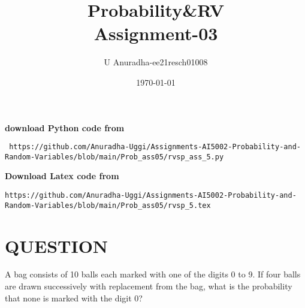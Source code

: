 \documentclass[journal,12pt,twocolumn]{IEEEtran}
\title{Probability\&RV \\ Assignment-03}
\author{U Anuradha-ee21resch01008}
\date{\today}
\begin{document}
\maketitle
\newpage
\bigskip
\renewcommand{\thefigure}{\theenumi}
\renewcommand{\thetable}{\theenumi}
\textbf{download Python code from}
\begin{lstlisting}
 https://github.com/Anuradha-Uggi/Assignments-AI5002-Probability-and-Random-Variables/blob/main/Prob_ass05/rvsp_ass_5.py
\end{lstlisting}
\textbf{Download Latex code from}
\begin{lstlisting}
https://github.com/Anuradha-Uggi/Assignments-AI5002-Probability-and-Random-Variables/blob/main/Prob_ass05/rvsp_5.tex
\end{lstlisting}
\section{\textbf{QUESTION}}
A bag consists of 10 balls each marked with one of the digits 0 to 9. If four balls are drawn successively with replacement from the bag,
what is the probability that none is marked with the digit 0?
\end{document}
